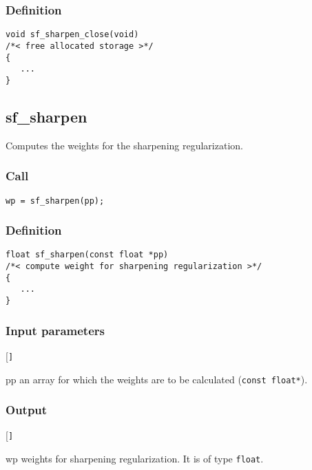 \subsubsection*{Definition}
\begin{verbatim}
void sf_sharpen_close(void)
/*< free allocated storage >*/
{
   ...
}
\end{verbatim}




\subsection{{sf\_sharpen}}
Computes the weights for the sharpening regularization.


\subsubsection*{Call}
\begin{verbatim}wp = sf_sharpen(pp);\end{verbatim}

\subsubsection*{Definition}
\begin{verbatim}
float sf_sharpen(const float *pp) 
/*< compute weight for sharpening regularization >*/
{
   ...
}
\end{verbatim}

\subsubsection*{Input parameters}
\begin{desclist}{\tt }{\quad}[\tt ]
   \setlength\itemsep{0pt}
   \item[pp] an array for which the weights are to be calculated (\texttt{const float*}).  
\end{desclist}

\subsubsection*{Output}
\begin{desclist}{\tt }{\quad}[\tt ]
   \setlength\itemsep{0pt}
   \item[wp] weights for sharpening regularization. It is of type \texttt{float}.
\end{desclist}




